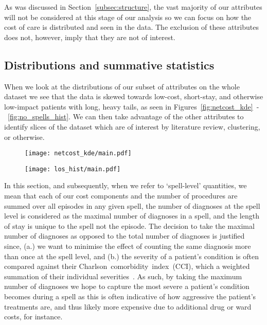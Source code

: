 As was discussed in Section~\ref{subsec:structure}, the vast majority of our
attributes will not be considered at this stage of our analysis so we can focus
on how the cost of care is distributed and seen in the data. The exclusion of
these attributes does not, however, imply that they are not of interest. 

\subsection{Distributions and summative
statistics}\label{subsec:distributions_statistics}
\graphicspath{{./img/general/}}

When we look at the distributions of our subset of attributes on the whole
dataset we see that the data is skewed towards low-cost, short-stay, and
otherwise low-impact patients with long, heavy tails, as seen in
Figures~\ref{fig:netcost_kde}~\--~\ref{fig:no_spells_hist}. We can then take
advantage of the other attributes to identify slices of the dataset which are of
interest by literature review, clustering, or otherwise.

\begin{figure}[h!]
    \centering
    \begin{minipage}{.495\textwidth}
        \texttt{[image: netcost\_kde/main.pdf]}
        \label{fig:netcost_kde}
    \end{minipage}\hfill%
    \begin{minipage}{.495\textwidth}
        \texttt{[image: los\_hist/main.pdf]}
        \label{fig:los_hist}
    \end{minipage}
\end{figure}

In this section, and subsequently, when we refer to `spell-level' quantities, we
mean that each of our cost components and the number of procedures are summed
over all episodes in any given spell, the number of diagnoses at the spell level
is considered as the maximal number of diagnoses in a spell, and the length of
stay is unique to the spell not the episode. The decision to take the maximal
number of diagnoses as opposed to the total number of diagnoses is justified
since, (a.) we want to minimise the effect of counting the same diagnosis more
than once at the spell level, and (b.) the severity of a patient's condition is
often compared against their Charlson~comorbidity~index~(CCI), which a weighted
summation of their individual severities~\cite{Thygesen2011}. As such, by taking
the maximum number of diagnoses we hope to capture the most severe a patient's
condition becomes during a spell as this is often indicative of how aggressive
the patient's treatments are, and thus likely more expensive due to additional
drug or ward costs, for instance.

